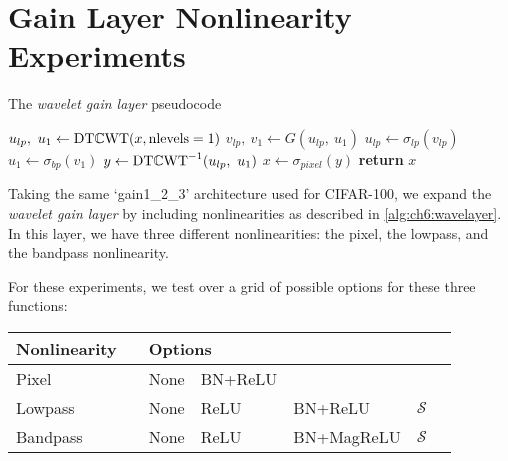 \section{Gain Layer Nonlinearity Experiments}\label{sec:ch6:nonlinear_exps}
\begin{algorithm}[t]
  \caption{The \emph{wavelet gain layer} pseudocode}\label{alg:ch6:wavelayer}
\begin{algorithmic}[1]
  \State $u_{lp},\ u_{1} \gets \mathrm{DT}\mathbb{C}\mathrm{WT}(x, \mbox{nlevels}=1) $ 
  \State $v_{lp},\ v_{1} \gets G(u_{lp},\ u_{1}) $ 
  \State $u_{lp} \gets \sigma_{lp}(v_{lp})$ 
  \State $u_{1} \gets \sigma_{bp}(v_{1})$ 
  \State $y \gets \mathrm{DT}\mathbb{C}\mathrm{WT}^{-1}(u_{lp},\ u_{1})$
  \State $x \gets \sigma_{pixel}(y)$ 
  \State \textbf{return} $x$
\EndProcedure
\end{algorithmic}
\end{algorithm}
Taking the same `gain1\_2\_3' architecture used for CIFAR-100, we expand the
\emph{wavelet gain layer} by including nonlinearities as described in 
\autoref{alg:ch6:wavelayer}. In this layer, we have three different nonlinearities:
the pixel, the lowpass, and the bandpass nonlinearity.

For these experiments, we test over a grid of possible options for these three
functions:
\begin{table}[h!]
  \centering
\begin{tabular}{l l l l l l l}
  \toprule
  Nonlinearity & \hphantom{abc} & \multicolumn{4}{l}{Options} \\
  \midrule
  Pixel && None & BN+ReLU \\
  Lowpass && None & ReLU & BN+ReLU & $\mathcal{S}$ \\
  Bandpass && None & ReLU & BN+MagReLU & $\mathcal{S}$ 
  \\\bottomrule
\end{tabular}
\end{table}

